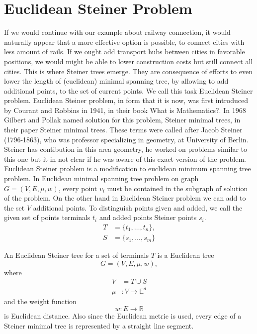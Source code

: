 \documentclass[openany]{book}
\begin{document}
	\section{Euclidean Steiner Problem}
	If we would continue with our example about railway connection, it would naturally appear that a more effective option is possible, to connect cities with less amount of rails. If we ought add transport hubs between cities in favorable positions, we would might be able to lower construction costs but still connect all cities. This is where Steiner trees emerge. They are consequence of efforts to even lower the length of (euclidean) minimal spanning tree, by allowing to add additional points, to the set of current points. We call this task Euclidean Steiner problem. 
	Euclidean Steiner problem, in form that it is now, was first introduced by Courant and Robbins in 1941, in their book What is Mathematics?. In 1968 Gilbert and Pollak named solution for this problem, Steiner minimal trees, in their paper Steiner minimal trees. These terms were called after Jacob Steiner (1796-1863), who was professor specializing in geometry, at University of Berlin. Steiner has contibution in this area geometry, he worked on problems similar to this one but it in not clear if he was aware of this exact version of the problem.
	Euclidean Steiner problem is a modification to euclidean minimum spanning tree problem. In Euclidean minimal spanning tree problem on graph \( G = (V, E, \mu, w) \), every point \(v_i\) must be contained in the subgraph of solution of the problem. On the other hand in Euclidean Steiner problem we can add to the set \(V\) additional points. To distinguish points given and added, we call the given set of points terminals \(t_i\) and added points Steiner points \(s_i\).
	\[
	\begin{aligned}
		T &= \{t_1, \dots, t_n\}, \\
		S &= \{s_1, \dots, s_m\}
	\end{aligned}
	\]
	
	An Euclidean Steiner tree for a set of terminals \( T \) is a Euclidean tree
	\[
	G = (V, E, \mu, w),
	\]
	where
	\[
	\begin{aligned}
	V &= T \cup S \\
	 \mu &: V \to \mathbb{E}^d  
	\end{aligned}
	\]
	and the weight function
	\[ w : E \to \mathbb{R} \]
	 is Euclidean distance. Also since the Euclidean metric is used, every edge of a Steiner minimal tree is represented by a straight line segment.
	 
\end{document}
